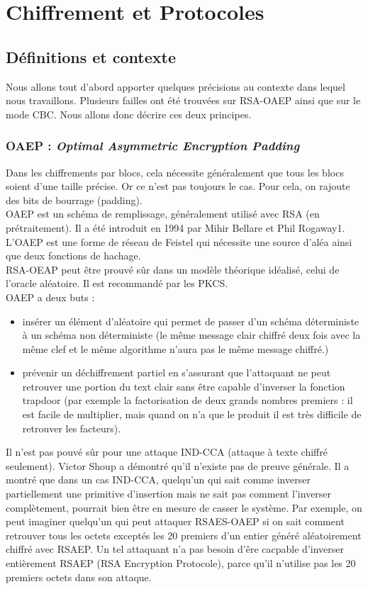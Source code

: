 \chapter{Chiffrement et Protocoles}

\section{Définitions et contexte}

Nous allons tout d'abord apporter quelques précisions au contexte dans lequel nous travaillons. Plusieurs failles ont été trouvées sur RSA-OAEP ainsi que sur le mode CBC. Nous allons donc décrire ces deux principes.
\subsection{OAEP : \textit{Optimal Asymmetric Encryption Padding}}
Dans les chiffrements par blocs, cela nécessite généralement que tous les blocs soient d'une taille précise. Or ce n'est pas toujours le cas. Pour cela, on rajoute des bits de bourrage (padding).\\
OAEP est un schéma de remplissage, généralement utilisé avec RSA (en prétraitement). Il a été introduit en 1994 par Mihir Bellare et Phil Rogaway1. L'OAEP est une forme de réseau de Feistel qui nécessite une source d'aléa ainsi que deux fonctions de hachage.\\
RSA-OEAP peut être prouvé sûr dans un modèle théorique idéalisé, celui de l'oracle aléatoire. Il est recommandé par les PKCS.\\
OAEP a deux buts : 
\begin{itemize}
	\item insérer un élément d'aléatoire qui permet de passer d'un schéma déterministe à un schéma non déterministe (le même message clair chiffré deux fois avec la même clef et le même algorithme n'aura pas le même message chiffré.)
	\item prévenir un déchiffrement partiel en s'assurant que l'attaquant ne peut retrouver une portion du text clair sans être capable d'inverser la fonction trapdoor (par exemple la factorisation de deux grands nombres premiers : il est facile de multiplier, mais quand on n'a que le produit  il est très difficile de retrouver les facteurs).\\
\end{itemize}
Il n'est pas pouvé sûr pour une attaque IND-CCA (attaque à texte chiffré seulement). Victor Shoup a démontré qu'il n'existe pas de preuve générale.
Il a montré que dans un cas IND-CCA, quelqu'un qui sait comme inverser partiellement une primitive d'insertion mais ne sait pas comment l'inverser complètement, pourrait bien être en mesure de casser le système. Par exemple, on peut imaginer quelqu'un qui peut attaquer RSAES-OAEP si on sait comment retrouver tous les octets exceptés les 20 premiers d'un entier généré aléatoirement chiffré avec RSAEP. Un tel attaquant n'a pas besoin d'êre cacpable d'inverser entièrement RSAEP (RSA Encryption Protocole), parce qu'il n'utilise pas les 20 premiers octets dans son attaque.

